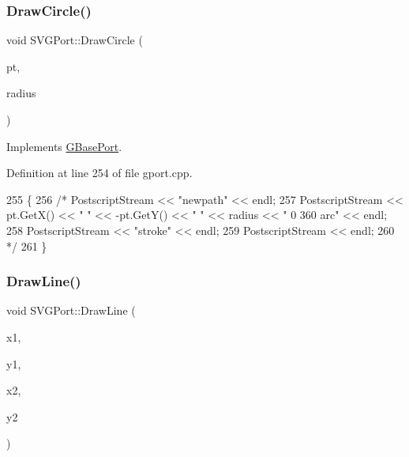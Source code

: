 \subsubsection{\texorpdfstring{Draw\+Circle()}{DrawCircle()}}
{\footnotesize\ttfamily void S\+V\+G\+Port\+::\+Draw\+Circle (\begin{DoxyParamCaption}\item[{const \mbox{\hyperlink{class_g_point}{G\+Point}} \&}]{pt,  }\item[{const int}]{radius }\end{DoxyParamCaption})\hspace{0.3cm}{\ttfamily [virtual]}}



Implements \mbox{\hyperlink{class_g_base_port_a7dbdd13c9a8f60537e7915a7991ab0f0}{G\+Base\+Port}}.



Definition at line 254 of file gport.\+cpp.


\begin{DoxyCode}
255 \{
256 \textcolor{comment}{/*  PostscriptStream << "newpath" << endl;}
257 \textcolor{comment}{    PostscriptStream << pt.GetX() << " " << -pt.GetY() << " " << radius << " 0 360 arc"         << endl;}
258 \textcolor{comment}{    PostscriptStream << "stroke"                                        << endl;}
259 \textcolor{comment}{    PostscriptStream << endl;}
260 \textcolor{comment}{*/}
261 \}
\end{DoxyCode}
\mbox{\label{class_s_v_g_port_ab51984003b6e8f6170ef3fe4ba09b030}} 
\subsubsection{\texorpdfstring{Draw\+Line()}{DrawLine()}}
{\footnotesize\ttfamily void S\+V\+G\+Port\+::\+Draw\+Line (\begin{DoxyParamCaption}\item[{const int}]{x1,  }\item[{const int}]{y1,  }\item[{const int}]{x2,  }\item[{const int}]{y2 }\end{DoxyParamCaption})\hspace{0.3cm}{\ttfamily [virtual]}}



